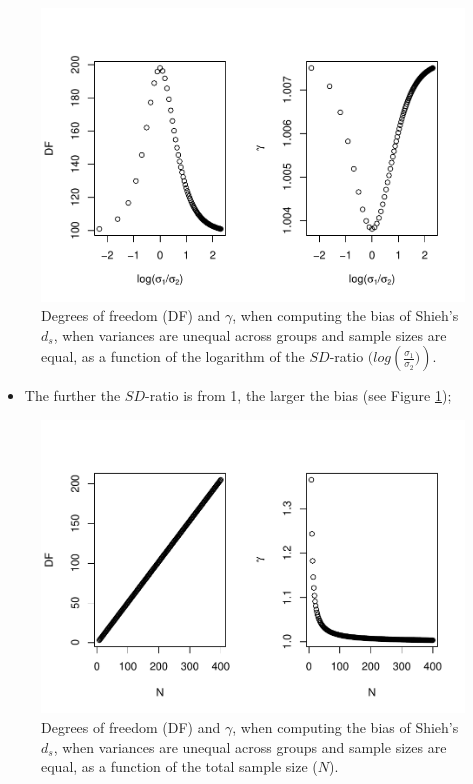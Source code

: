 \documentclass[
  english,
  man]{apa6}
\providecommand{\tightlist}{%
  \setlength{\itemsep}{0pt}\setlength{\parskip}{0pt}}
\begin{document}
\begin{figure}
\centering
\includegraphics{Theoretical-Bias-of-all-estimators-as-a-function-of-population-parameters_files/figure-latex/biasshiehhetbalSDratio2-1.pdf}
\caption{\label{fig:biasshiehhetbalSDratio2}Degrees of freedom (DF) and \(\gamma\), when computing the bias of Shieh's \(d_s\), when variances are unequal across groups and sample sizes are equal, as a function of the logarithm of the \(SD\)-ratio \((log \left(\frac{\sigma_1}{\sigma_2})\right)\).}
\end{figure}

\begin{itemize}
\tightlist
\item
  The further the \(SD\)-ratio is from 1, the larger the bias (see Figure \ref{fig:biasshiehhetbalSDratio2});
\end{itemize}

\begin{figure}
\centering
\includegraphics{Theoretical-Bias-of-all-estimators-as-a-function-of-population-parameters_files/figure-latex/biasshiehhetbalNsize2-1.pdf}
\caption{\label{fig:biasshiehhetbalNsize2}Degrees of freedom (DF) and \(\gamma\), when computing the bias of Shieh's \(d_s\), when variances are unequal across groups and sample sizes are equal, as a function of the total sample size (\(N\)).}
\end{figure}
\end{document}
